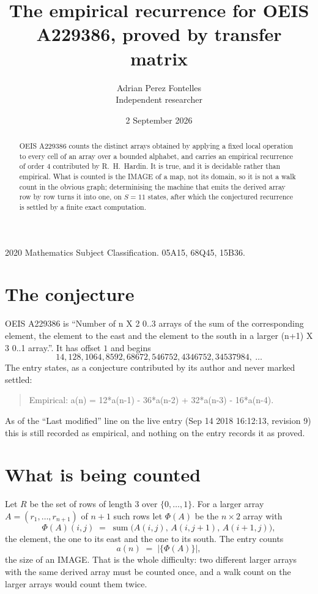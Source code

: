 \documentclass[11pt,a4paper]{article}
\title{The empirical recurrence for OEIS A229386, proved by transfer matrix}
\author{Adrian Perez Fontelles\\ \small Independent researcher}
\date{2 September 2026}
\theoremstyle{plain}
\theoremstyle{definition}
\begin{document}
\maketitle

\begin{abstract}
OEIS A229386 counts the distinct arrays obtained by applying a fixed local operation to every cell
of an array over a bounded alphabet, and carries an empirical recurrence of order $4$
contributed by R.~H.~Hardin. It is true, and it is decidable rather than empirical. What is
counted is the IMAGE of a map, not its domain, so it is not a walk count in the obvious graph;
determinising the machine that emits the derived array row by row turns it into one, on
$S=11$ states, after which the conjectured recurrence is settled by a finite exact
computation.
\end{abstract}

\noindent\small 2020 Mathematics Subject Classification. 05A15, 68Q45, 15B36.\normalsize

\section{The conjecture}

OEIS A229386 is ``Number of n X 2 0..3 arrays of the sum of the corresponding element, the element to the east and the element to the south in a larger (n+1) X 3 0..1 array.''. It has offset $1$ and begins
\[
14, 128, 1064, 8592, 68672, 546752, 4346752, 34537984,\ \dots
\]
The entry states, as a conjecture contributed by its author and never marked settled:
\begin{quote}
Empirical: a(n) = 12*a(n-1) - 36*a(n-2) + 32*a(n-3) - 16*a(n-4).
\end{quote}
As of the ``Last modified'' line on the live entry (Sep 14 2018 16:12:13, revision 9) this is still
recorded as empirical, and nothing on the entry records it as proved.

\section{What is being counted}

Let $R$ be the set of rows of length $3$ over $\{0,\dots,1\}$.
For a larger array $A=(r_1,\dots,r_{n+1})$ of $n+1$ such rows let $\Phi(A)$ be the
$n\times2$ array with
\[
\Phi(A)(i,j)\;=\;\operatorname{sum}\bigl(A(i,j),\,A(i,j+1),\,A(i+1,j)\bigr),
\]
the element, the one to its east and the one to its south. The entry counts
\[
a(n)\;=\;\bigl|\{\Phi(A)\}\bigr| ,
\]
the size of an IMAGE. That is the whole difficulty: two different larger arrays with the same
derived array must be counted once, and a walk count on the larger arrays would count them
twice.
\end{document}
